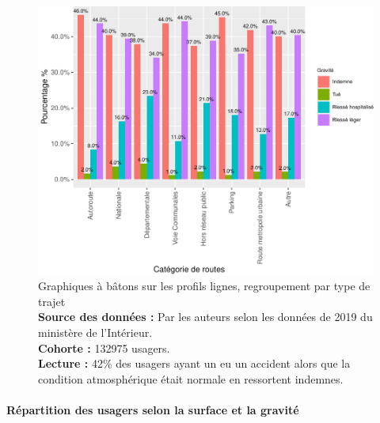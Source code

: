 \documentclass[french,]{tp}
\let\oldparagraph\paragraph
\renewcommand{\paragraph}[1]{\oldparagraph{#1}\mbox{}}
\begin{document}
\begin{figure}[ht!]

{\centering \includegraphics{Prediction_Gravite_files/figure-latex/barplotroute-1} 

}

\caption{Graphiques à bâtons sur les profils lignes, regroupement par type de trajet\\
\textbf{Source des données :} Par les auteurs selon les données de 2019 du ministère de l'Intérieur.\\
\textbf{Cohorte :} 132975 usagers.\\
\textbf{Lecture :} 42\% des usagers ayant un eu un accident alors que la condition atmosphérique était normale en ressortent indemnes.}\label{fig:barplotroute}
\end{figure}

\hypertarget{ruxe9partition-des-usagers-selon-la-surface-et-la-gravituxe9}{%
\paragraph{Répartition des usagers selon la surface et la gravité}\label{ruxe9partition-des-usagers-selon-la-surface-et-la-gravituxe9}}
\end{document}
